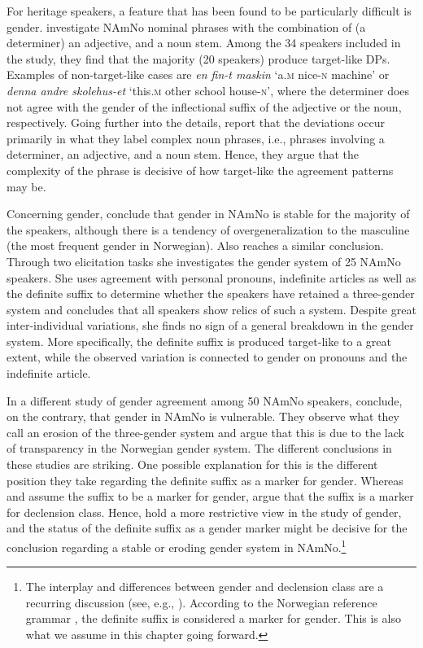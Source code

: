 \documentclass[output=paper]{langscibook}
\begin{document}
For heritage speakers, a feature that has been found to be particularly difficult is gender. \citet{JohannessenLarsson2015} investigate NAmNo nominal phrases with the combination of (a determiner) an adjective, and a noun stem. Among the 34 speakers included in the study, they find that the majority (20 speakers) produce target-like DPs. Examples of non-target-like cases are \textit{en fin-t maskin} ‘a.\textsc{m} nice-\textsc{n} machine’ or \textit{denna andre skolehus-et} ‘this\textsc{.m} other school house-\textsc{n’,} where the determiner does not agree with the gender of the inflectional suffix of the adjective or the noun, respectively. Going further into the details, \citet{JohannessenLarsson2015} report that the deviations occur primarily in what they label complex noun phrases, i.e., phrases involving a determiner, an adjective, and a noun stem. Hence, they argue that the complexity of the phrase is decisive of how target-like the agreement patterns may be. 



Concerning gender, \citet{JohannessenLarsson2015} conclude that gender in NAmNo is stable for the majority of the speakers, although there is a tendency of overgeneralization to the masculine (the most frequent gender in Norwegian). Also \citet{Rødvand2017} reaches a similar conclusion. Through two elicitation tasks she investigates the gender system of 25 NAmNo speakers. She uses agreement with personal pronouns, indefinite articles as well as the definite suffix to determine whether the speakers have retained a three-gender system and concludes that all speakers show relics of such a system. Despite great inter-individual variations, she finds no sign of a general breakdown in the gender system. More specifically, the definite suffix is produced target-like to a great extent, while the observed variation is connected to gender on pronouns and the indefinite article. 



In a different study of gender agreement among 50 NAmNo speakers, \citet{LohndalWestergaard2016} conclude, on the contrary, that gender in NAmNo is vulnerable. They observe what they call an erosion of the three-gender system and argue that this is due to the lack of transparency in the Norwegian gender system. The different conclusions in these studies are striking. One possible explanation for this is the different position they take regarding the definite suffix as a marker for gender. Whereas \citet{JohannessenLarsson2015} and \citet{Rødvand2017} assume the suffix to be a marker for gender, \citet{LohndalWestergaard2016} argue that the suffix is a marker for declension class. Hence, \citet{LohndalWestergaard2016} hold a more restrictive view in the study of gender, and the status of the definite suffix as a gender marker might be decisive for the conclusion regarding a stable or eroding gender system in NAmNo.\footnote{ \textrm{The interplay and differences between gender and declension class are a recurring discussion (see, e.g., \citealt{Enger2004}). According to the Norwegian reference grammar \citep{FaarlundEtAl1997}, the definite suffix is considered a marker for gender. This is also what we assume in this chapter going forward.} }
\end{document}
